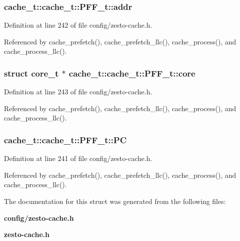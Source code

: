\subsubsection[{addr}]{ cache\_\-t::cache\_\-t::PFF\_\-t::addr}\label{structcache__t_1_1PFF__t_d40018d2e3f94882eb9efb9679f34b81}




Definition at line 242 of file config/zesto-cache.h.

Referenced by cache\_\-prefetch(), cache\_\-prefetch\_\-llc(), cache\_\-process(), and cache\_\-process\_\-llc().
\subsubsection[{core}]{\setlength{\rightskip}{0pt plus 5cm}struct {\bf core\_\-t} $\ast$ cache\_\-t::cache\_\-t::PFF\_\-t::core\hspace{0.3cm}{\tt  [read]}}\label{structcache__t_1_1PFF__t_da71bd0bf3f3106401f83d829a56bcfd}




Definition at line 243 of file config/zesto-cache.h.

Referenced by cache\_\-prefetch(), cache\_\-prefetch\_\-llc(), cache\_\-process(), and cache\_\-process\_\-llc().
\subsubsection[{PC}]{ cache\_\-t::cache\_\-t::PFF\_\-t::PC}\label{structcache__t_1_1PFF__t_96f8adb51522af01b03f963cbc774eac}




Definition at line 241 of file config/zesto-cache.h.

Referenced by cache\_\-prefetch(), cache\_\-prefetch\_\-llc(), cache\_\-process(), and cache\_\-process\_\-llc().

The documentation for this struct was generated from the following files:\begin{CompactItemize}
\item 
{\bf config/zesto-cache.h}\item 
{\bf zesto-cache.h}\end{CompactItemize}
